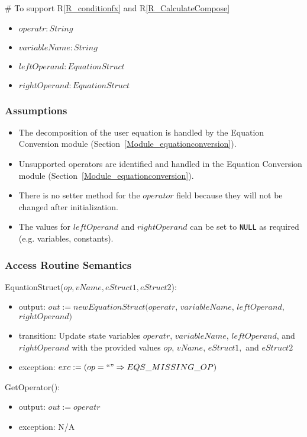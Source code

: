 \documentclass[12pt, titlepage]{article}
\newcommand{\rref}[1]{R\ref{#1}}
\begin{document}
\# To support \rref{R_conditionfx} and \rref{R_CalculateCompose}
\begin{itemize}
	\item $operatr : String$
	\item $variableName : String$
	\item $leftOperand : EquationStruct$
	\item $rightOperand : EquationStruct$
\end{itemize}

\subsubsection{Assumptions}

\begin{itemize}
	\item The decomposition of the user equation is handled by the Equation 
	Conversion module (Section~\ref{Module_equationconversion}).
	\item Unsupported operators are identified and handled in the Equation 
	Conversion module (Section~\ref{Module_equationconversion}).
	\item There is no setter method for the $operator$ field because they will 
	not be changed after initialization.
	\item The values for $leftOperand$ and $rightOperand$ can be set to 
	\texttt{NULL} as required (e.g. variables, constants).
\end{itemize}

\subsubsection{Access Routine Semantics}

\noindent EquationStruct($op, vName, eStruct1, eStruct2$):
\begin{itemize}
	\item output: $out := new EquationStruct(operatr$, $variableName$, 
	$leftOperand$, $rightOperand)$
	\item transition: Update state variables $operatr$, $variableName$, 
	$leftOperand$, and $rightOperand$ with the provided values $op$, $vName$, 
	$eStruct1,$ and $eStruct2$
	\item exception: $exc := \\
	(op = ``" \Rightarrow EQS\_MISSING\_OP)$
\end{itemize}

\noindent GetOperator():
\begin{itemize}
	\item output: $out := operatr$
	\item exception: N/A
\end{itemize}
\end{document}
